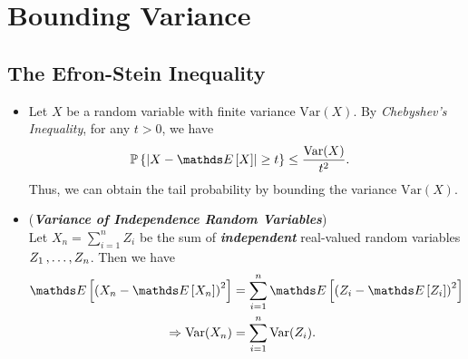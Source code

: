 \documentclass[11pt]{article}
\begin{document}
\section{Bounding Variance}
\subsection{The Efron-Stein Inequality}
\begin{itemize}
\item \begin{remark}
Let $X$ be a random variable with finite variance $\text{Var}(X)$.  By \emph{Chebyshev's Inequality},  for any $t > 0$, we have
\begin{align*}
\bP\set{\abs{X - \E{}{X}} \ge t} &\le \frac{\text{Var}(X)}{t^2}. 
\end{align*}
Thus, we can obtain the tail probability by bounding the variance $\text{Var}(X)$.
\end{remark}


\item \begin{remark} (\textbf{\emph{Variance of Independence Random Variables}})\\
Let $X_n =  \sum_{i=1}^{n}Z_i$ be the sum of \emph{\textbf{independent}} real-valued random variables $Z_1 \,{,}\ldots{,}\, Z_n$. Then we have 
\begin{align*}
\E{}{\paren{X_n - \E{}{X_n}}^2} &= \sum_{i=1}^{n}\E{}{\paren{Z_i - \E{}{Z_i}}^2}\\
\Rightarrow \text{Var}(X_n) &= \sum_{i=1}^{n}\text{Var}(Z_i).
\end{align*}
\end{remark}


\end{itemize}
\end{document}
